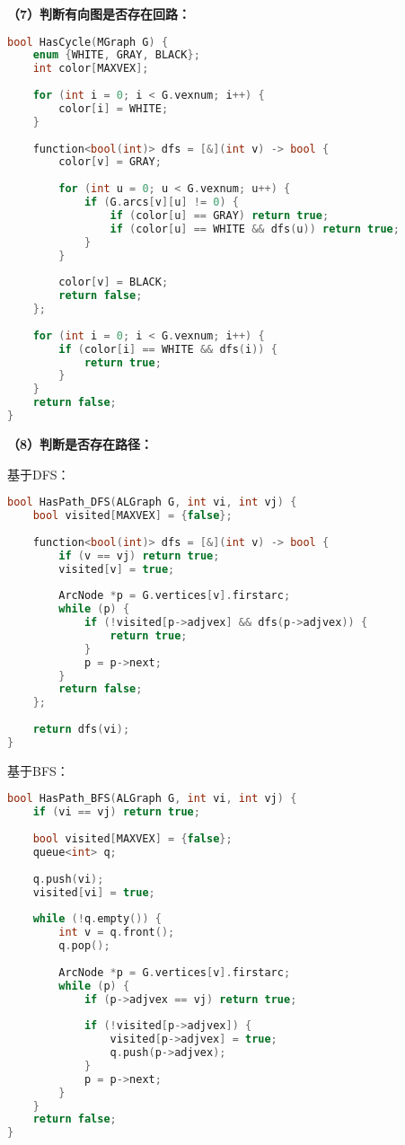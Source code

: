 \documentclass[12pt,a4paper]{amsart}
\begin{document}
\textbf{（7）判断有向图是否存在回路：}

\begin{lstlisting}[language=C++]
bool HasCycle(MGraph G) {
    enum {WHITE, GRAY, BLACK};
    int color[MAXVEX];
    
    for (int i = 0; i < G.vexnum; i++) {
        color[i] = WHITE;
    }
    
    function<bool(int)> dfs = [&](int v) -> bool {
        color[v] = GRAY;
        
        for (int u = 0; u < G.vexnum; u++) {
            if (G.arcs[v][u] != 0) {
                if (color[u] == GRAY) return true;
                if (color[u] == WHITE && dfs(u)) return true;
            }
        }
        
        color[v] = BLACK;
        return false;
    };
    
    for (int i = 0; i < G.vexnum; i++) {
        if (color[i] == WHITE && dfs(i)) {
            return true;
        }
    }
    return false;
}
\end{lstlisting}

\textbf{（8）判断是否存在路径：}

基于DFS：
\begin{lstlisting}[language=C++]
bool HasPath_DFS(ALGraph G, int vi, int vj) {
    bool visited[MAXVEX] = {false};
    
    function<bool(int)> dfs = [&](int v) -> bool {
        if (v == vj) return true;
        visited[v] = true;
        
        ArcNode *p = G.vertices[v].firstarc;
        while (p) {
            if (!visited[p->adjvex] && dfs(p->adjvex)) {
                return true;
            }
            p = p->next;
        }
        return false;
    };
    
    return dfs(vi);
}
\end{lstlisting}

基于BFS：
\begin{lstlisting}[language=C++]
bool HasPath_BFS(ALGraph G, int vi, int vj) {
    if (vi == vj) return true;
    
    bool visited[MAXVEX] = {false};
    queue<int> q;
    
    q.push(vi);
    visited[vi] = true;
    
    while (!q.empty()) {
        int v = q.front();
        q.pop();
        
        ArcNode *p = G.vertices[v].firstarc;
        while (p) {
            if (p->adjvex == vj) return true;
            
            if (!visited[p->adjvex]) {
                visited[p->adjvex] = true;
                q.push(p->adjvex);
            }
            p = p->next;
        }
    }
    return false;
}
\end{lstlisting}
\end{document}
